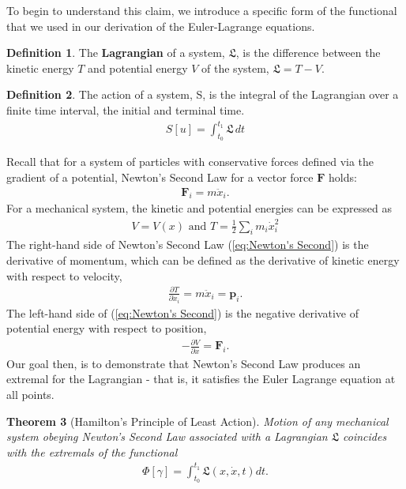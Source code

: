 \documentclass[10pt, psamsfonts]{amsart}
\newtheorem{thm}{Theorem}[section]
\theoremstyle{definition}
\newtheorem{defn}[thm]{Definition}
\theoremstyle{remark}
\numberwithin{equation}{section}
\begin{document}
\noindent To begin to understand this claim, we introduce a specific form of the functional that we used in our derivation of the Euler-Lagrange equations.

\begin{defn}
The \textbf{Lagrangian} of a system, $\mathfrak{L}$, is the difference between the kinetic energy $T$ and potential energy $V$ of the system, $\mathfrak{L} = T - V$.
\end{defn}
\begin{defn}
The action of a system, S, is the integral of the Lagrangian over a finite time interval, the initial and terminal time.
\begin{align*}
  S[u] = \int_{t_0}^{t_1} \mathfrak{L}\,dt  
\end{align*}
\end{defn}

Recall that for a system of particles with conservative forces defined via the gradient of a potential, Newton's Second Law for a vector force $\textbf{F}$ holds:
\begin{align}
  \label{eq:Newton's Second}
  \bm{F}_i = m \ddot{x}_i.
\end{align}
For a mechanical system, the kinetic and potential energies can be expressed as 
\begin{align}
  \label{eq:Kinetic, Potential}
  V = V(x) \text{ and } T = \frac{1}{2} \sum_i m_i \dot{x}_i^2
\end{align}
The right-hand side of Newton's Second Law (\ref{eq:Newton's Second}) is the derivative of momentum, which can be defined as the derivative of kinetic energy with respect to velocity,
\begin{align}
\label{eq:kinetic}
  \frac{\partial T }{\partial \dot{x}_i} = m\ddot{x}_i = \bm{p}_i.
\end{align}
The left-hand side of (\ref{eq:Newton's Second}) is the negative derivative of potential energy with respect to position,
\begin{align}
  \label{eq:potential}
  -\frac{\partial V}{\partial x} = \bm{F}_i.
 \end{align}
Our goal then, is to demonstrate that Newton's Second Law produces an extremal for the Lagrangian - that is, it satisfies the Euler Lagrange equation at all points.

\begin{thm}[Hamilton's Principle of Least Action]
Motion of any mechanical system obeying Newton's Second Law associated with a Lagrangian $\mathfrak{L}$ coincides with the extremals of the functional
\begin{align*}
  \Phi[\gamma] = \int_{t_0}^{t_1} \mathfrak{L}  (x, \dot{x}, t)dt.
\end{align*}
\end{thm}
\end{document}
